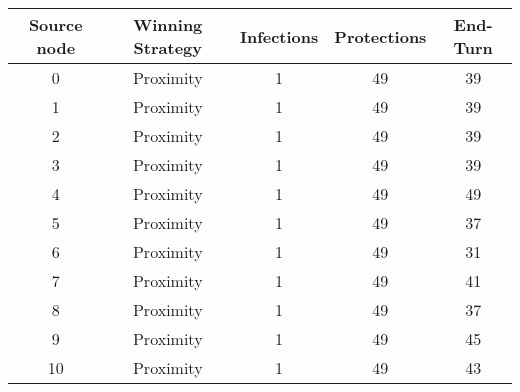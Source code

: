 \documentclass[results.tex]{subfiles}
\begin{document}
    \begin{center}
        \begin{tabular}{| c || c | c | c | c |}
            \hline
            {\bfseries Source node} & {\bfseries Winning Strategy} & {\bfseries Infections} & {\bfseries Protections}
            & {\bfseries End-Turn}
            \\  %
            \hline\hline
            0                       & Proximity                    & 1                      & 49                      & 39                   \\
            \hline
            1                       & Proximity                    & 1                      & 49                      & 39                   \\
            \hline
            2                       & Proximity                    & 1                      & 49                      & 39                   \\
            \hline
            3                       & Proximity                    & 1                      & 49                      & 39                   \\
            \hline
            4                       & Proximity                    & 1                      & 49                      & 49                   \\
            \hline
            5                       & Proximity                    & 1                      & 49                      & 37                   \\
            \hline
            6                       & Proximity                    & 1                      & 49                      & 31                   \\
            \hline
            7                       & Proximity                    & 1                      & 49                      & 41                   \\
            \hline
            8                       & Proximity                    & 1                      & 49                      & 37                   \\
            \hline
            9                       & Proximity                    & 1                      & 49                      & 45                   \\
            \hline
            10                      & Proximity                    & 1                      & 49                      & 43                   \\

\end{tabular}
\end{center}
\end{document}
